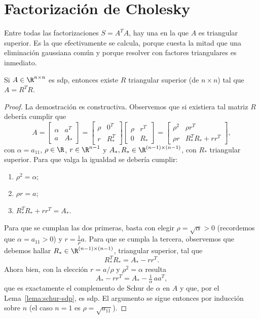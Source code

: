 \section{Factorización de Cholesky}
\label{sec:cholesky}

Entre todas las factorizaciones $S=A^TA$, hay una en la que $A$ es triangular
superior. Es la que efectivamente se calcula, porque cuesta la mitad que una
eliminación gaussiana común y porque resolver con factores triangulares es
inmediato.

\begin{theorem}\label{T:cholesky}
  Si $A \in \R^{n\times n}$ es sdp, entonces existe $R$ triangular superior
  (de $n\times n$) tal que $A = R^T R$.
\end{theorem}

\begin{proof}
  La demostración es constructiva. Observemos que si existiera tal matriz $R$
  debería cumplir que
  \[
  A = \begin{bmatrix} \alpha & a^T \\ a & A_*
  \end{bmatrix}
  = \begin{bmatrix} \rho & 0^T \\ r & R_*^T
  \end{bmatrix}
  \begin{bmatrix} \rho & r^T \\ 0 & R_*
  \end{bmatrix}
  =\begin{bmatrix} \rho^2 & \rho r^T \\ \rho r & R_*^T R_* + r r^T
  \end{bmatrix} ,
  \]
  con $\alpha = a_{11}$, $\rho \in \R$, $r \in \R^{n-1}$ y
  $A_*, R_* \in \R^{(n-1)\times (n-1)}$, con $R_*$ triangular superior.
  Para que valga la igualdad se debería cumplir:
  \begin{enumerate}
  \item $\rho^2 = \alpha$;
  \item $\rho r = a$;
  \item $R_*^T R_* + r r^T = A_*$.
  \end{enumerate}
  Para que se cumplan las dos primeras, basta con elegir
  $\rho = \sqrt{\alpha} > 0$ (recordemos que $\alpha = a_{11} > 0$) y
  $r = \frac1\rho a$. Para que se cumpla la tercera, observemos que debemos
  hallar $R_* \in \R^{(n-1)\times (n-1)}$, triangular superior, tal que
  \[
  R_*^T R_* = A_* - r r^T .
  \]
  Ahora bien, con la elección $r=a/\rho$ y $\rho^2=\alpha$ resulta
  \[
  A_* - rr^T = A_* - \tfrac1\alpha\, aa^T ,
  \]
  que es exactamente el complemento de Schur de $\alpha$ en $A$ y que, por el
  Lema~\ref{lema:schur-sdp}, es sdp. El argumento se sigue entonces por
  inducción sobre $n$ (el caso $n=1$ es $\rho=\sqrt{a_{11}}$).
\end{proof}

